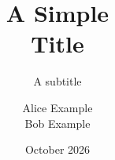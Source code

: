 \documentclass[11pt]{beamer}
\title{A Simple\\Title}
\subtitle{A subtitle}
\author{Alice Example\\Bob Example}
\institute{Example University}
\date{October 2026}
\begin{document}
\begin{frame}\titlepage\end{frame}
\end{document}
